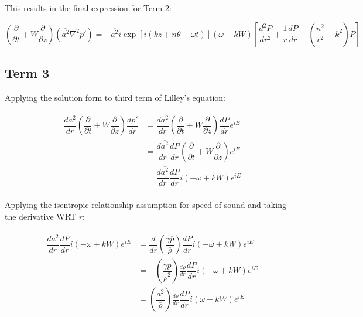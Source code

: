 \documentclass[]{aiaa-tc}%
\begin{document}
This results in the final expression for Term 2:

\begin{equation} \label{term2solv}
\boxed{ \left( \dfrac{\partial}{\partial t}
  + W \dfrac{\partial}{\partial z} \right)
  (\overline{a^2}\nabla^2p')
= - \overline{a^2} i\exp[i(kz + n\theta -\omega t)]
    (\omega - kW) \left[ \dfrac{d^2P}{dr^2}
    + \dfrac{1}{r} \dfrac{dP}{dr}
    - \left( \dfrac{n^2}{r^2} + k^2 \right) P \right] }
\end{equation}





\clearpage
\subsection{Term 3}

Applying the solution form to third term of Lilley's equation:

\begin{align*}
\dfrac{d \overline{a^2}}{dr} \left( \dfrac{\partial}{\partial t} + W \dfrac{\partial}{\partial z} \right) \dfrac{dp'}{dr}
&= \dfrac{d \overline{a^2}}{dr}
   \left( \dfrac{\partial}{\partial t} + W \dfrac{\partial}{\partial z} \right)
   \dfrac{dP}{dr} e^{iE}  \\
&= \dfrac{d \overline{a^2}}{dr} \dfrac{dP}{dr}
   \left( \dfrac{\partial}{\partial t} + W \dfrac{\partial}{\partial z} \right) e^{iE} \\
&= \dfrac{d \overline{a^2}}{dr} \dfrac{dP}{dr}
    i(-\omega + kW) e^{iE} \\
\end{align*}

Applying the isentropic relationship assumption for speed of sound and taking the derivative WRT $r$:

\begin{align*}
\dfrac{d \overline{a^2}}{dr} \dfrac{dP}{dr}
    i(-\omega + kW) e^{iE}
&= \dfrac{d}{dr} \left(\dfrac{\gamma \overline{p}}{\overline{\rho}}\right)
    \dfrac{dP}{dr} i(-\omega + kW) e^{iE} \\
&= -\left(\dfrac{\gamma \overline{p}}{\overline{\rho}^2}\right) \frac{d \overline{\rho}}{dr}
    \dfrac{dP}{dr} i(-\omega + kW) e^{iE} \\
&= \left(\dfrac{\overline{a^2}}{\overline{\rho}}\right) \frac{d \overline{\rho}}{dr} \dfrac{dP}{dr} i(\omega - kW) e^{iE} \\
\end{align*}
\end{document}
